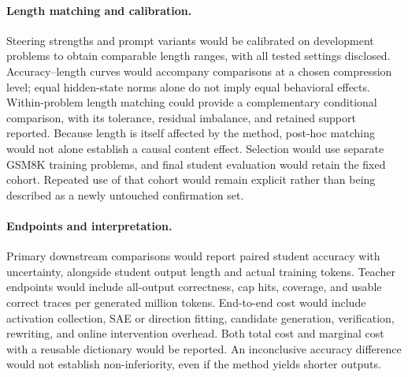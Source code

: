 \paragraph{Length matching and calibration.}
Steering strengths and prompt variants would be calibrated on development problems to obtain comparable length ranges, with all tested settings disclosed.
Accuracy--length curves would accompany comparisons at a chosen compression level; equal hidden-state norms alone do not imply equal behavioral effects.
Within-problem length matching could provide a complementary conditional comparison, with its tolerance, residual imbalance, and retained support reported.
Because length is itself affected by the method, post-hoc matching would not alone establish a causal content effect.
Selection would use separate GSM8K training problems, and final student evaluation would retain the fixed cohort.
Repeated use of that cohort would remain explicit rather than being described as a newly untouched confirmation set.

\paragraph{Endpoints and interpretation.}
Primary downstream comparisons would report paired student accuracy with uncertainty, alongside student output length and actual training tokens.
Teacher endpoints would include all-output correctness, cap hits, coverage, and usable correct traces per generated million tokens.
End-to-end cost would include activation collection, SAE or direction fitting, candidate generation, verification, rewriting, and online intervention overhead.
Both total cost and marginal cost with a reusable dictionary would be reported.
An inconclusive accuracy difference would not establish non-inferiority, even if the method yields shorter outputs.
